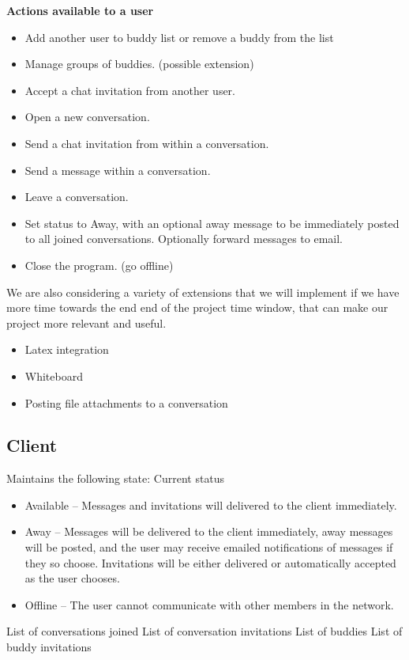 \documentclass[11pt,letterpaper]{article}
\begin{document}
{\bf Actions available to a user}
\begin{itemize}\item Add another user to buddy list or remove a buddy from the list
\item Manage groups of buddies. (possible extension)
\item Accept a chat invitation from another user.
\item Open a new conversation.
\item Send a chat invitation from within a conversation.
\item Send a message within a conversation.
\item Leave a conversation.
\item Set status to Away, with an optional away message to be immediately posted to all joined conversations.  Optionally forward
messages to email.
\item Close the program.  (go offline)
\end{itemize}

We are also considering a variety of extensions that we will implement if we have more time towards the end end of the project time window, that can make our project more relevant and useful.
\begin{itemize}
\item Latex integration
\item Whiteboard
\item Posting file attachments to a conversation
\end{itemize}

\subsection{Client}
Maintains the following state:\newline
Current status
\begin{itemize}
\item Available -- Messages and invitations will delivered to the client immediately.  
\item Away -- Messages will be delivered to the client immediately, away messages will be posted, and the user may receive emailed
notifications of messages if they so choose.  Invitations will be either delivered or automatically accepted as the user chooses.
\item Offline -- The user cannot communicate with other members in the network.
\end{itemize}
List of conversations joined\newline
List of conversation invitations\newline
List of buddies\newline
List of buddy invitations
\end{document}
